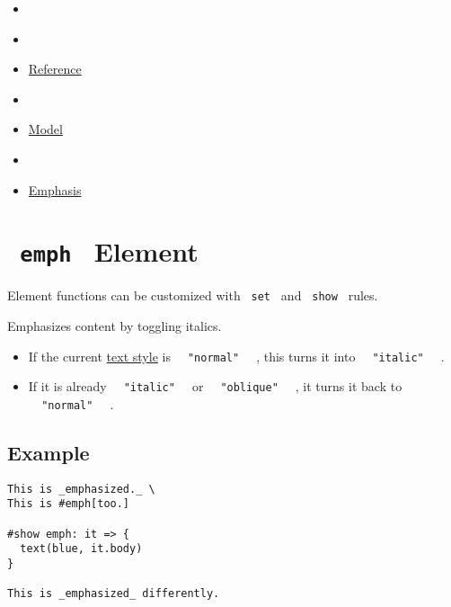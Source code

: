 \begin{itemize}
\tightlist
\item
  \href{/docs}{}
\item
  
\item
  \href{/docs/reference/}{Reference}
\item
  
\item
  \href{/docs/reference/model/}{Model}
\item
  
\item
  \href{/docs/reference/model/emph/}{Emphasis}
\end{itemize}

\section{\texorpdfstring{\texttt{\ emph\ } {{ Element
}}}{ emph   Element }}\label{summary}

\label{element-tooltip}
Element functions can be customized with \texttt{\ set\ } and
\texttt{\ show\ } rules.

Emphasizes content by toggling italics.

\begin{itemize}
\tightlist
\item
  If the current
  \href{/docs/reference/text/text/\#parameters-style}{text style} is
  \texttt{\ }{\texttt{\ "normal"\ }}\texttt{\ } , this turns it into
  \texttt{\ }{\texttt{\ "italic"\ }}\texttt{\ } .
\item
  If it is already \texttt{\ }{\texttt{\ "italic"\ }}\texttt{\ } or
  \texttt{\ }{\texttt{\ "oblique"\ }}\texttt{\ } , it turns it back to
  \texttt{\ }{\texttt{\ "normal"\ }}\texttt{\ } .
\end{itemize}

\subsection{Example}\label{example}

\begin{verbatim}
This is _emphasized._ \
This is #emph[too.]

#show emph: it => {
  text(blue, it.body)
}

This is _emphasized_ differently.
\end{verbatim}

